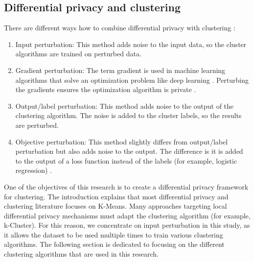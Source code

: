 \subsection{Differential privacy and clustering}
There are different ways how to combine differential privacy with clustering \citep{baraheem_survey_2022}:
\begin{enumerate}
  \item Input perturbation: This method adds noise to the input data, so the cluster algorithms are trained on perturbed data.
  \item Gradient perturbation: The term gradient is used in machine learning algorithms that solve an optimization problem like deep learning \citep{hassan_differential_2019}.
        Perturbing the gradients ensures the optimization algorithm is private \citep{ji_differential_2014}.
  \item Output/label perturbation: This method adds noise to the output of the clustering algorithm.
        The noise is added to the cluster labels, so the results are perturbed.
  \item Objective perturbation: This method slightly differs from output/label perturbation but also adds noise to the output.
        The difference is it is added to the output of a loss function instead of the labels (for example, logistic regression) \citep{baraheem_survey_2022}.
\end{enumerate}
One of the objectives of this research is to create a differential privacy framework for clustering.
The introduction  explains that most differential privacy and clustering literature focuses on K-Means.
Many approaches targeting local differential privacy mechanisms must adapt the clustering algorithm (for example, k-Cluster).
For this reason, we concentrate on input perturbation in this study, as it allows the dataset to be used multiple times to train various clustering algorithms.
The following section is dedicated to focusing on the different clustering algorithms that are used in this research.